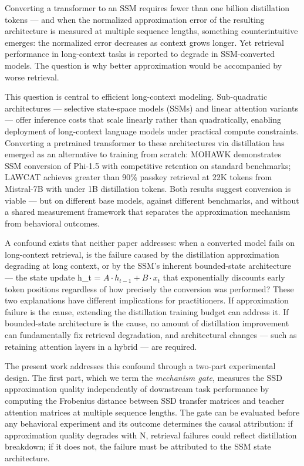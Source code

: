 
Converting a transformer to an SSM requires fewer than one billion distillation tokens --- and when the normalized approximation error of the resulting architecture is measured at multiple sequence lengths, something counterintuitive emerges: the normalized error decreases as context grows longer. Yet retrieval performance in long-context tasks is reported to degrade in SSM-converted models. The question is why better approximation would be accompanied by worse retrieval.

This question is central to efficient long-context modeling. Sub-quadratic architectures --- selective state-space models (SSMs) and linear attention variants --- offer inference costs that scale linearly rather than quadratically, enabling deployment of long-context language models under practical compute constraints. Converting a pretrained transformer to these architectures via distillation has emerged as an alternative to training from scratch: MOHAWK \citep{Bick2024MOHAWK} demonstrates SSM conversion of Phi-1.5 with competitive retention on standard benchmarks; LAWCAT \citep{Liu2025} achieves greater than 90\% passkey retrieval at 22K tokens from Mistral-7B with under 1B distillation tokens. Both results suggest conversion is viable --- but on different base models, against different benchmarks, and without a shared measurement framework that separates the approximation mechanism from behavioral outcomes.

A confound exists that neither paper addresses: when a converted model fails on long-context retrieval, is the failure caused by the distillation approximation degrading at long context, or by the SSM's inherent bounded-state architecture --- the state update h\_t = $A\cdot h_{t-1} + B\cdot x_t$ that exponentially discounts early token positions regardless of how precisely the conversion was performed? These two explanations have different implications for practitioners. If approximation failure is the cause, extending the distillation training budget can address it. If bounded-state architecture is the cause, no amount of distillation improvement can fundamentally fix retrieval degradation, and architectural changes --- such as retaining attention layers in a hybrid --- are required.

The present work addresses this confound through a two-part experimental design. The first part, which we term the \textit{mechanism gate}, measures the SSD approximation quality independently of downstream task performance by computing the Frobenius distance between SSD transfer matrices and teacher attention matrices at multiple sequence lengths. The gate can be evaluated before any behavioral experiment and its outcome determines the causal attribution: if approximation quality degrades with N, retrieval failures could reflect distillation breakdown; if it does not, the failure must be attributed to the SSM state architecture.

